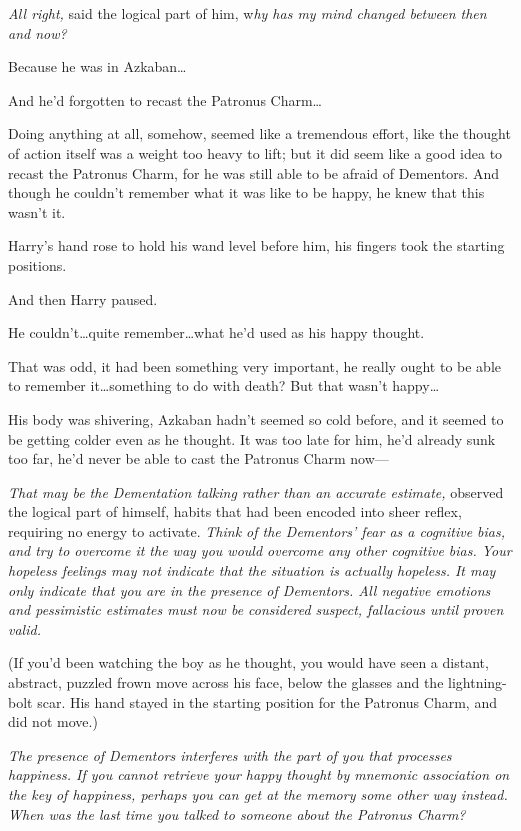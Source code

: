 \emph{All right,} said the logical part of him, w\emph{hy has my mind changed between then and now?}

Because he was in Azkaban…

And he’d forgotten to recast the Patronus Charm…

Doing anything at all, somehow, seemed like a tremendous effort, like the thought of action itself was a weight too heavy to lift; but it did seem like a good idea to recast the Patronus Charm, for he was still able to be afraid of Dementors. And though he couldn’t remember what it was like to be happy, he knew that this wasn’t it.

Harry’s hand rose to hold his wand level before him, his fingers took the starting positions.

And then Harry paused.

He couldn’t…quite remember…what he’d used as his happy thought.

That was odd, it had been something very important, he really ought to be able to remember it…something to do with death? But that wasn’t happy…

His body was shivering, Azkaban hadn’t seemed so cold before, and it seemed to be getting colder even as he thought. It was too late for him, he’d already sunk too far, he’d never be able to cast the Patronus Charm now—

\emph{That may be the Dementation talking rather than an accurate estimate,} observed the logical part of himself, habits that had been encoded into sheer reflex, requiring no energy to activate. \emph{Think of the Dementors’ fear as a cognitive bias, and try to overcome it the way you would overcome any other cognitive bias. Your hopeless feelings may not indicate that the situation is actually hopeless. It may only indicate that you are in the presence of Dementors. All negative emotions and pessimistic estimates must now be considered suspect, fallacious until proven valid.}

(If you’d been watching the boy as he thought, you would have seen a distant, abstract, puzzled frown move across his face, below the glasses and the lightning-bolt scar. His hand stayed in the starting position for the Patronus Charm, and did not move.)

\emph{The presence of Dementors interferes with the part of you that processes happiness. If you cannot retrieve your happy thought by mnemonic association on the key of happiness, perhaps you can get at the memory some other way instead. When was the last time you talked to someone about the Patronus Charm?}

